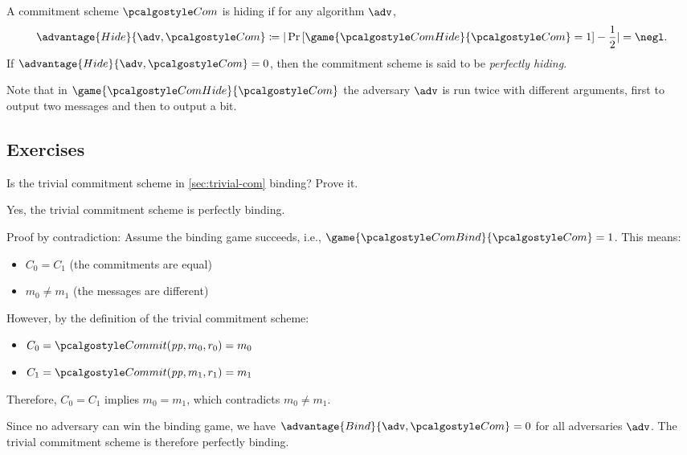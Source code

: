 \begin{definition}[Hiding]
  A commitment scheme $\algo{Com}$ is hiding if for any \ppt algorithm $\adv$,
 \[
  \advantage{Hide}{\adv, \algo{Com}} \defeq |\pr{\game{\algo{ComHide}}{\algo{Com}} = 1} - \frac{1}{2}| = \negl.
 \]
 If $\advantage{Hide}{\adv, \algo{Com}} = 0$, then the commitment scheme is said to be \emph{perfectly hiding}.
\end{definition}

Note that in $\game{\algo{ComHide}}{\algo{Com}}$ the adversary $\adv$ is run twice with different arguments, first to output two messages and then to output a bit.

\subsection{Exercises}

\begin{exercise}
  Is the trivial commitment scheme in \cref{sec:trivial-com} binding?
  Prove it.
\end{exercise}

\ifsolutions
\begin{mysolution}
  Yes, the trivial commitment scheme is perfectly binding.
  
  Proof by contradiction: Assume the binding game succeeds, i.e., $\game{\algo{ComBind}}{\algo{Com}} = 1$.
  This means:
  \begin{itemize}
    \item $C_0 = C_1$ (the commitments are equal)
    \item $m_0 \neq m_1$ (the messages are different)
  \end{itemize}
  
  However, by the definition of the trivial commitment scheme:
  \begin{itemize}
    \item $C_0 = \algo{Commit}(\params, m_0, r_0) = m_0$
    \item $C_1 = \algo{Commit}(\params, m_1, r_1) = m_1$
  \end{itemize}
  
  Therefore, $C_0 = C_1$ implies $m_0 = m_1$, which contradicts $m_0 \neq m_1$.
  
  Since no adversary can win the binding game, we have $\advantage{Bind}{\adv, \algo{Com}} = 0$ for all adversaries $\adv$.
  The trivial commitment scheme is therefore perfectly binding.
\end{mysolution}
\fi


